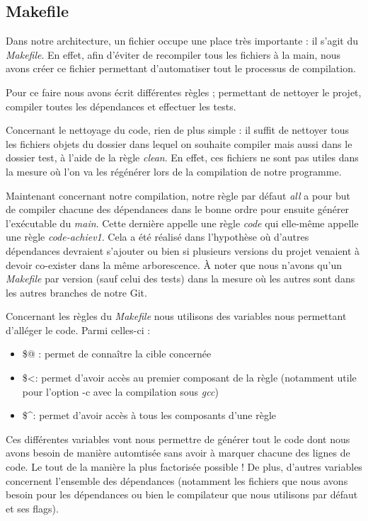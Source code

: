 \documentclass{article}
\begin{document}

\subsection{Makefile}
\label{subsct:makefile}
Dans notre architecture, un fichier occupe une place très importante : il s'agit du \textit{Makefile}. En effet, afin d'éviter de recompiler tous les fichiers à la main, nous avons créer ce fichier permettant d'automatiser tout le processus de compilation.

Pour ce faire nous avons écrit différentes règles ; permettant de nettoyer le projet, compiler toutes les dépendances et effectuer les tests.

Concernant le nettoyage du code, rien de plus simple : il suffit de nettoyer tous les fichiers objets du dossier dans lequel on souhaite compiler mais aussi dans le dossier test, à l'aide de la règle \textit{clean}. En effet, ces fichiers ne sont pas utiles dans la mesure où l'on va les régénérer lors de la compilation de notre programme.

Maintenant concernant notre compilation, notre règle par défaut \textit{all} a pour but de compiler chacune des dépendances dans le bonne ordre pour ensuite générer l'exécutable du \textit{main}. Cette dernière appelle une règle \textit{code} qui elle-même appelle une règle \textit{code-achiev1}. Cela a été réalisé dans l'hypothèse où d'autres dépendances devraient s'ajouter ou bien si plusieurs versions du projet venaient à devoir co-exister dans la même arborescence.  À noter que nous n'avons qu'un \textit{Makefile} par version (sauf celui des tests) dans la mesure où les autres sont dans les autres branches de notre Git.

Concernant les règles du \textit{Makefile} nous utilisons des variables nous permettant d'alléger le code. Parmi celles-ci :
\begin{itemize}
    \item \$@ : permet de connaître la cible concernée
    \item \$\textless : permet d'avoir accès au premier composant de la règle (notamment utile pour l'option -c avec la compilation sous \textit{gcc})
    \item \$\textasciicircum : permet d'avoir accès à tous les composants d'une règle 
\end{itemize}

Ces différentes variables vont nous permettre de générer tout le code dont nous avons besoin de manière automtisée sans avoir à marquer chacune des lignes de code. Le tout de la manière la plus factorisée possible ! De plus, d'autres variables concernent l'ensemble des dépendances (notamment les fichiers que nous avons besoin pour les dépendances ou bien le compilateur que nous utilisons par défaut et ses flags).
\end{document}
